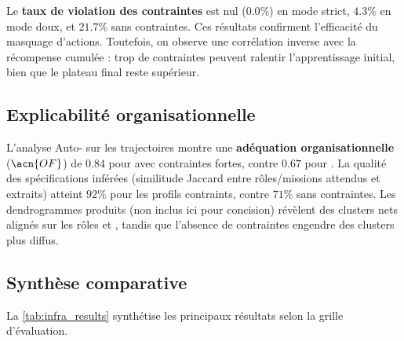 Le \textbf{taux de violation des contraintes} est nul ($0.0\%$) en mode strict, $4.3\%$ en mode doux, et $21.7\%$ sans contraintes.
Ces résultats confirment l'efficacité du masquage d'actions.
Toutefois, on observe une corrélation inverse avec la récompense cumulée : trop de contraintes peuvent ralentir l'apprentissage initial, bien que le plateau final reste supérieur.

\subsection*{Explicabilité organisationnelle}

L'analyse Auto- sur les trajectoires montre une \textbf{adéquation organisationnelle} ($\acn{OF}$) de $0.84$ pour  avec contraintes fortes, contre $0.67$ pour .
La qualité des spécifications inférées (similitude Jaccard entre rôles/missions attendus et extraits) atteint $92\%$ pour les profils contraints, contre $71\%$ sans contraintes.
Les dendrogrammes produits (non inclus ici pour concision) révèlent des clusters nets alignés sur les rôles  et , tandis que l'absence de contraintes engendre des clusters plus diffus.

\subsection*{Synthèse comparative}

La \autoref{tab:infra_results} synthétise les principaux résultats selon la grille d'évaluation.

